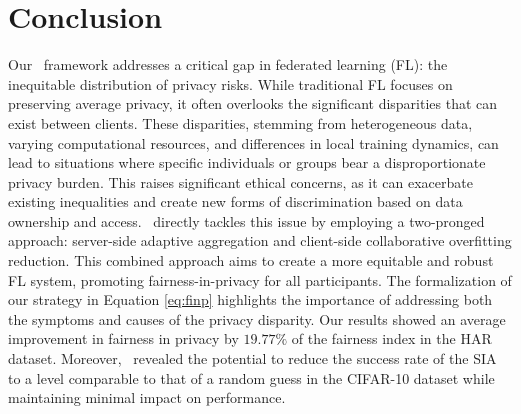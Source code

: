\section{Conclusion}
Our \sysname\ framework addresses a critical gap in federated learning (FL): the inequitable distribution of privacy risks. While traditional FL focuses on preserving average privacy, it often overlooks the significant disparities that can exist between clients. These disparities, stemming from heterogeneous data, varying computational resources, and differences in local training dynamics, can lead to situations where specific individuals or groups bear a disproportionate privacy burden. This raises significant ethical concerns, as it can exacerbate existing inequalities and create new forms of discrimination based on data ownership and access. \sysname\ directly tackles this issue by employing a two-pronged approach: server-side adaptive aggregation and client-side collaborative overfitting reduction. This combined approach aims to create a more equitable and robust FL system, promoting fairness-in-privacy for all participants. The formalization of our strategy in Equation \ref{eq:finp} highlights the importance of addressing both the symptoms and causes of the privacy disparity. 
Our results showed an average improvement in fairness in privacy by $19.77\%$ of the fairness index in the HAR dataset. Moreover, \sysname\ revealed the potential to reduce the success rate of the SIA to a level comparable to that of a random guess in the CIFAR-10 dataset while maintaining minimal impact on performance.